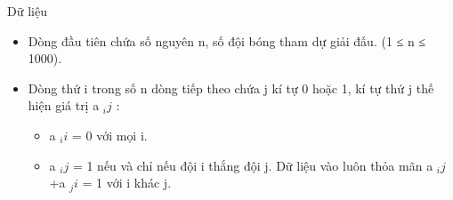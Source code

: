 Dữ liệu
\begin{itemize}
	\item Dòng đầu tiên chứa số nguyên n, số đội bóng tham dự giải đấu. (1 ≤ n ≤ 1000).
	\item Dòng thứ i trong số n dòng tiếp theo chứa j kí tự 0 hoặc 1, kí tự thứ j thế hiện giá trị a $_ ij $ :
\begin{itemize}
	\item a $_ ii $ = 0 với mọi i.
	\item a $_ ij $ = 1 nếu và chỉ nếu đội i thắng đội j. Dữ liệu vào luôn thỏa mãn a $_ ij $ +a $_ ji $ = 1 với i khác j.
\end{itemize}
\end{itemize}